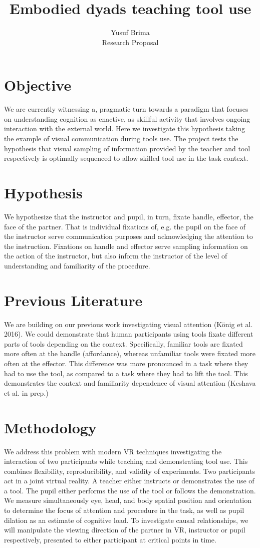 \documentclass[12pt,a4paper]{article}
\author{Yusuf Brima \\
	\small Research Proposal
}
\title{Embodied dyads teaching tool use}
\begin{document}
\maketitle
\date{}
\section{Objective}
We are currently witnessing a, pragmatic turn towards a paradigm that focuses on understanding cognition as  enactive, as skillful activity that involves ongoing interaction with the external world. Here we investigate this hypothesis taking the example of visual communication during tools use. The project tests the hypothesis that visual sampling of information provided by the teacher and tool respectively is optimally sequenced to allow skilled tool use in the task context.
\section{Hypothesis}
We hypothesize that the instructor and pupil, in turn, fixate handle,  effector, the face of the partner. That is individual fixations of, e.g. the pupil on the face of the instructor serve communication purposes and acknowledging the attention to the instruction. Fixations on handle and effector serve sampling information on the action of the instructor, but also inform the instructor of the level of understanding and familiarity of the procedure.
\section{Previous Literature}
 We are building on our previous work investigating visual attention (König et al. 2016).  We could demonstrate that human participants using tools fixate different parts of tools depending on the context. Specifically, familiar tools are fixated more often at the handle (affordance), whereas unfamiliar tools were fixated more often at the effector. This difference was more pronounced in a task where they had to use the tool, as compared to a task where they had to lift the tool. This demonstrates the context and familiarity dependence of visual attention (Keshava et al. in prep.)
\section{Methodology}
We address this problem with modern VR techniques investigating the interaction of two participants while teaching and demonstrating tool use. This combines flexibility, reproducibility, and validity of experiments. Two participants act in a joint virtual reality. A teacher either instructs or demonstrates the use of a tool. The pupil either performs the use of the tool or follows the demonstration. We measure simultaneously eye, head, and body spatial position and orientation to determine the focus of attention and procedure in the task, as well as pupil dilation as an estimate of cognitive load. To investigate causal relationships, we will manipulate the viewing direction of the partner in VR, instructor or pupil respectively, presented to either participant at critical points in time.
\end{document}
